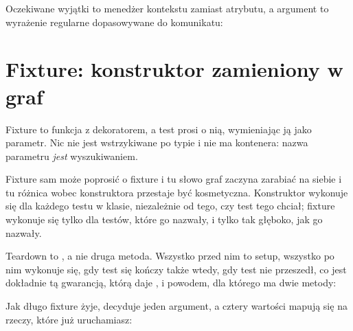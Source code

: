 \noindent
Oczekiwane wyjątki to menedżer kontekstu zamiast atrybutu, a argument
 to wyrażenie regularne dopasowywane do komunikatu:


\section{Fixture: konstruktor zamieniony w graf}
\label{sec:testing-fixtures}

Fixture to funkcja z dekoratorem, a test prosi o nią, wymieniając ją jako
parametr. Nic nie jest wstrzykiwane po typie i nie ma kontenera: nazwa
parametru \emph{jest} wyszukiwaniem.


\noindent
Fixture sam może poprosić o fixture i tu słowo graf zaczyna zarabiać na
siebie \dash{} i tu różnica wobec konstruktora przestaje być kosmetyczna.
Konstruktor wykonuje się dla każdego testu w klasie, niezależnie od tego,
czy test tego chciał; fixture wykonuje się tylko dla testów, które go
nazwały, i tylko tak głęboko, jak go nazwały.



\noindent
Teardown to , a nie druga metoda. Wszystko przed nim to setup,
wszystko po nim wykonuje się, gdy test się kończy \dash{} także wtedy, gdy
test nie przeszedł, co jest dokładnie tą gwarancją, którą daje ,
i powodem, dla którego  ma dwie metody:


\noindent
Jak długo fixture żyje, decyduje jeden argument, a cztery wartości mapują
się na rzeczy, które już uruchamiasz:

